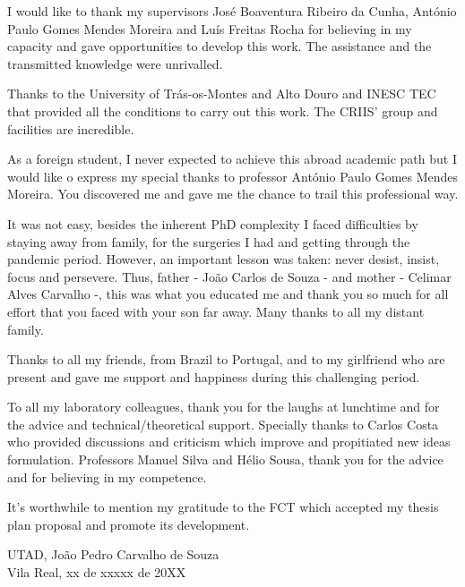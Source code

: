 I would like to thank my supervisors José Boaventura Ribeiro da Cunha, António Paulo Gomes Mendes Moreira and Luís Freitas Rocha for believing in my capacity and gave opportunities to develop this work. The assistance and the transmitted knowledge were unrivalled. 


Thanks to the University of Trás-os-Montes and Alto Douro and INESC TEC that provided all the conditions to carry out this work. The CRIIS' group and facilities are incredible.

As a foreign student, I never expected to achieve this abroad academic path but I would like o express my special thanks to professor António Paulo Gomes Mendes Moreira. You discovered me and gave me the chance to trail this professional way.

It was not easy, besides the inherent PhD complexity I faced difficulties by staying away from family,  for the surgeries I had and getting through the pandemic period. However, an important lesson was taken: never desist, insist, focus and persevere. Thus, father - João Carlos de Souza - and mother - Celimar Alves Carvalho -, this was what you educated me and thank you so much for all effort that you faced with your son far away. Many thanks to all my distant family.

Thanks to all my friends, from Brazil to Portugal, and to my girlfriend who are present and gave me support and happiness during this challenging period. 

To all my laboratory colleagues, thank you for the laughs at lunchtime and for the advice and technical/theoretical support. Specially thanks to Carlos Costa who provided discussions and criticism which improve and propitiated new ideas formulation. Professors Manuel Silva and Hélio Sousa, thank you for the advice and for believing in my competence. 

It's worthwhile to mention my gratitude to the FCT which accepted my thesis plan proposal and promote its development.


\EspacoMedio
\EspacoMedio
\EspacoMedio
\noindent UTAD, \hfill João Pedro Carvalho de Souza \\ Vila Real, xx de xxxxx de 20XX
